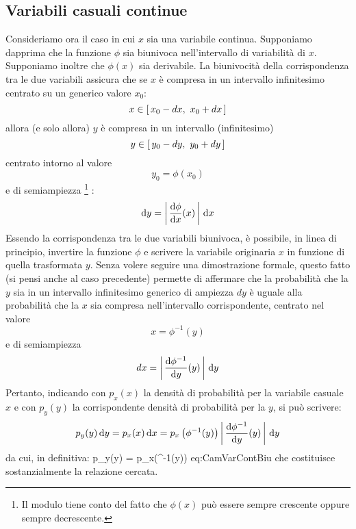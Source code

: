 \begin{exemplify}

\end{exemplify}


\subsection{Variabili casuali continue}

Consideriamo ora il caso in cui $x$ sia una variabile
continua. Supponiamo dapprima che la funzione $\phi$
sia biunivoca nell'intervallo di variabilit\`a di $x$.
Supponiamo inoltre che $\phi(x)$ sia derivabile. La biunivocit\`a della
corrispondenza tra le due variabili assicura che se $x$ \`e compresa
in un intervallo infinitesimo centrato su un generico valore $x_0$:
$$
x \in \left[ \, x_0 - dx, ~ x_0 + dx \, \right]
$$
allora (e solo allora) $y$ \`e compresa in un intervallo (infinitesimo)
$$
y \in \left[ \, y_0 - dy, ~ y_0 + dy \, \right]
$$
centrato intorno al valore
$$
y_0 = \phi(x_0)
$$
e di semiampiezza%
\footnote{Il modulo tiene conto del fatto che $\phi(x)$ pu\`o essere
sempre crescente oppure sempre decrescente.
}%
:
$$
\mathrm{d} y = \left| \, \displaystyle \frac{\mathrm{d}\phi}{\mathrm{d} x}({x}) \, \right| \, \mathrm{d} x
$$
Essendo la corrispondenza tra le due variabili biunivoca, \`e possibile, in
linea di principio, invertire la funzione $\phi$ e scrivere la variabile
originaria $x$ in funzione di quella trasformata $y$.
Senza volere seguire una dimostrazione formale, questo fatto 
(si pensi anche al caso precedente) permette di affermare che la
probabilit\`a che la $y$ sia in un intervallo infinitesimo generico
di ampiezza $dy$ \`e uguale alla probabilit\`a che la $x$ sia compresa
nell'intervallo corrispondente, centrato nel valore
$$
x = \phi^{-1}(y)
$$
e di semiampiezza
$$
dx = \left| \, \displaystyle \frac{\mathrm{d}\phi^{-1}}{\mathrm{d} y}({y}) \, \right| \, \mathrm{d} y
$$
Pertanto, indicando con $p_x(x)$ la densit\`a di probabilit\`a per la variabile
casuale $x$ e con $p_y(y)$ la corrispondente densit\`a di probabilit\`a per la
$y$, si pu\`o scrivere:
$$
p_y(y) \, \mathrm{d} y = p_x(x) \, \mathrm{d} x =
p_x\left(\phi^{-1}(y)\right)\left| \, \displaystyle \frac{\mathrm{d}\phi^{-1}}{\mathrm{d} y}({y}) \, \right| \, \mathrm{d} y
$$
da cui, in definitiva:
\eqnlbox
{p_y(y) = p_x\left(\phi^{-1}(y)\right)}
{eq:CamVarContBiu}
che costituisce sostanzialmente la relazione cercata.

